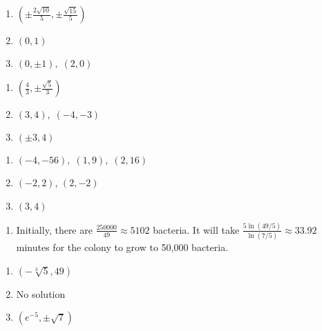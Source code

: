 \begin{multicols}{3}
\begin{enumerate}
\setcounter{enumi}{\value{HW}}

\item $\left( \pm \frac{2 \sqrt{10}}{5}, \pm \frac{\sqrt{15}}{5} \right)$
\item $(0, 1)$
\item $(0, \pm 1), \; (2, 0)$


\setcounter{HW}{\value{enumi}}
\end{enumerate}
\end{multicols}

\begin{multicols}{3}
\begin{enumerate}
\setcounter{enumi}{\value{HW}}
\item $\left( \frac{4}{3}, \pm \frac{\sqrt{5}}{3} \right)$
\item $(3, 4), \; (-4, -3)$
\item $(\pm 3, 4)$
\setcounter{HW}{\value{enumi}}
\end{enumerate}
\end{multicols}

\begin{multicols}{3}
\begin{enumerate}
\setcounter{enumi}{\value{HW}}

\item $(-4, -56), \; (1, 9), \; (2, 16)$
\item $(-2,2)$, $(2,-2)$
\item $(3, 4)$

\setcounter{HW}{\value{enumi}}
\end{enumerate}
\end{multicols}


\begin{enumerate}
\setcounter{enumi}{\value{HW}}

\item  Initially, there are $\frac{250000}{49} \approx 5102$ bacteria.  It will take $\frac{5\ln(49/5)}{\ln(7/5)} \approx 33.92$ minutes for the colony to grow to 50,000 bacteria.

\setcounter{HW}{\value{enumi}}
\end{enumerate}


\begin{multicols}{3}
\begin{enumerate}
\setcounter{enumi}{\value{HW}}

\item $\left( -\sqrt[3]{5}, 49 \right)$
\item No solution
\item $\left( e^{-5}, \pm \sqrt{7} \right)$

\setcounter{HW}{\value{enumi}}
\end{enumerate}
\end{multicols}

